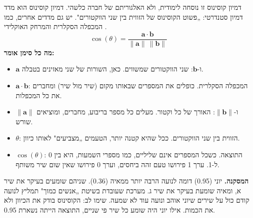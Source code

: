 \begin{lab}{דמיון קוסינוס}
זו נוסחה לימודית, ולא האלגוריתם של חברה כלשהי. דמיון קוסינוס הוא מדד דמיון סטנדרטי: „פשוט הקוסינוס של הזווית בין שני הווקטורים". יש גם מדדים אחרים, כמו המכפלה הסקלרית והמרחק האוקלידי \cite{google2026candidate}.
\[\cos(\theta)=\frac{\mathbf{a}\cdot\mathbf{b}}{\lVert\mathbf{a}\rVert\,\lVert\mathbf{b}\rVert}\]
\textbf{מה כל סימן אומר:}
\begin{itemize}
  \item $\mathbf{a}$ ו-$\mathbf{b}$: שני הווקטורים שמשווים. כאן, השורות של שני מאזינים בטבלה.
  \item $\mathbf{a}\cdot\mathbf{b}$: המכפלה הסקלרית. כופלים את המספרים שבאותו מקום (שיר מול שיר) ומחברים את כל המכפלות.
  \item $\lVert\mathbf{a}\rVert$ ו-$\lVert\mathbf{b}\rVert$: האורך של כל וקטור. מעלים כל מספר בריבוע, מחברים, ומוציאים שורש.
  \item $\theta$: הזווית בין שני הווקטורים. ככל שהיא קטנה יותר, הטעמים „מצביעים" לאותו כיוון.
  \item $\cos(\theta)$: התוצאה. כשכל המספרים אינם שליליים, כמו מספרי השמעות, היא בין 0 ל-1. ערך 1 פירושו טעם זהה ביחסים, וערך 0 פירושו שאין שום שיר משותף.
\end{itemize}



\textbf{המסקנה.} יוני (0.95) דומה לנועה הרבה יותר ממאיה (0.36). שניהם שומעים בעיקר את שיר א, ומאיה שומעת בעיקר את שיר ג. מערכת שעובדת בשיטת „אנשים כמוך" תמליץ לנועה קודם כול על שירים שיוני אוהב ונועה עוד לא שמעה. שימו לב: הקוסינוס בודק את הכיוון ולא את הכמות. אילו יוני היה שומע כל שיר פי שניים, התוצאה הייתה נשארת 0.95.
\end{lab}

